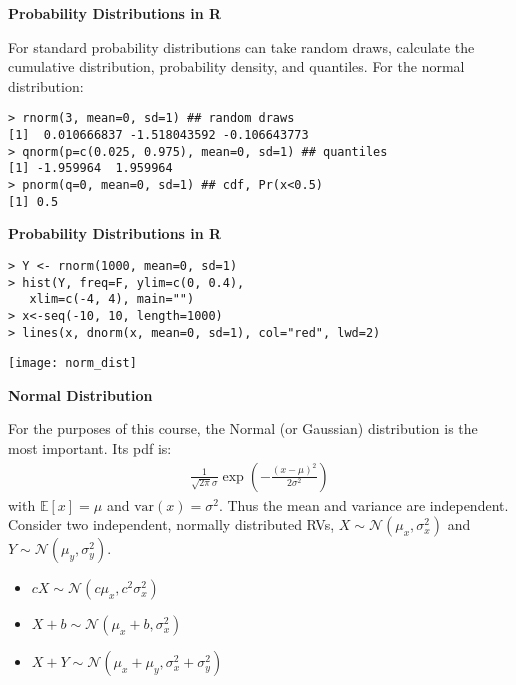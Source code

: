 \documentclass[12pt,xcolor=svgnames]{beamer}
\newcommand{\bl}{\color{blue}}
\newcommand{\theme}{\color{FireBrick}}
\newcommand{\mc}[1]{\mathcal{#1}}
\newcommand{\ds}[1]{\mathds{#1}}
\newcommand{\sk}{\vspace{.4cm}}
\newcommand{\nsk}{\vspace{-.4cm}}
\newcommand{\chap}[1]{{\theme \Large \bf #1} \sk}
\newcommand{\E}{\ds{E}}
\newcommand{\var}{\text{var}}
\newcommand{\mN}{\mc{N}}
\begin{document}
\begin{frame}[fragile]
\chap{Probability Distributions in {\sf R}}

For standard probability distributions  can take random draws, calculate the cumulative distribution, probability density, and quantiles. For the normal distribution:

{\bl
\begin{verbatim}
> rnorm(3, mean=0, sd=1) ## random draws
[1]  0.010666837 -1.518043592 -0.106643773  
> qnorm(p=c(0.025, 0.975), mean=0, sd=1) ## quantiles
[1] -1.959964  1.959964
> pnorm(q=0, mean=0, sd=1) ## cdf, Pr(x<0.5)
[1] 0.5
\end{verbatim}
}

\end{frame}

\begin{frame}[fragile]
\chap{Probability Distributions in {\sf R}}

\nsk
{\bl
\begin{verbatim}
> Y <- rnorm(1000, mean=0, sd=1) 
> hist(Y, freq=F, ylim=c(0, 0.4), 
   xlim=c(-4, 4), main="")
> x<-seq(-10, 10, length=1000)
> lines(x, dnorm(x, mean=0, sd=1), col="red", lwd=2) 
\end{verbatim}
}

\begin{center}
\texttt{[image: norm\_dist]}
\end{center}

\end{frame}



\begin{frame}
\chap{Normal Distribution}

For the purposes of this course, the {\bl Normal} (or Gaussian) distribution is the most important. Its pdf is:
\begin{align*}
\frac{1}{\sqrt{2\pi}\sigma}\exp{\left(-\frac{(x-\mu)^2}{2\sigma^2}\right)}
\end{align*}
with $\E[x]=\mu$ and $\var(x)=\sigma^2$. Thus the mean and variance are independent. Consider two independent, normally distributed RVs, $X \sim \mN( \mu_x ,\sigma_x^2)$ and $Y \sim \mN( \mu_y ,\sigma_y^2)$. 

\begin{itemize}
\item $cX \sim \mN( c \mu_x , c^2 \sigma_x^2)$
\item $X+b \sim \mN( \mu_x + b , \sigma_x^2)$
\item $X + Y  \sim \mN( \mu_x + \mu_y ,\sigma_x^2 + \sigma_y^2)$
\end{itemize}



\end{frame}
\end{document}
